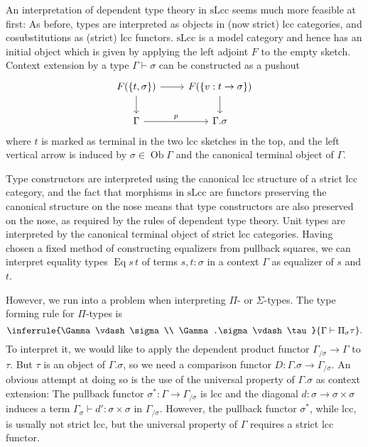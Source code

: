 \documentclass{article}
\begin{document}
An interpretation of dependent type theory in $\mathrm{sLcc}$ seems much more feasible at first:
As before, types are interpreted as objects in (now strict) lcc categories, and cosubstitutions as (strict) lcc functors.
$\mathrm{sLcc}$ is a model category and hence has an initial object which is given by applying the left adjoint $F$ to the empty sketch.
Context extension by a type $\Gamma \vdash \sigma$ can be constructed as a pushout
\begin{equation}
  \label{eq:slcc-context-extension}
  \begin{tikzcd}
    F(\{t, \sigma\}) \arrow[r] \arrow[d] & F(\{v : t \rightarrow \sigma \}) \arrow[d] \\
    \Gamma \arrow[r, "p"] & \Gamma.\sigma
  \end{tikzcd}
\end{equation}
where $t$ is marked as terminal in the two lcc sketches in the top, and the left vertical arrow is induced by $\sigma \in \operatorname{Ob} \Gamma$ and the canonical terminal object of $\Gamma$.

Type constructors are interpreted using the canonical lcc structure of a strict lcc category, and the fact that morphisms in $\mathrm{sLcc}$ are functors preserving the canonical structure on the nose means that type constructors are also preserved on the nose, as required by the rules of dependent type theory.
Unit types are interpreted by the canonical terminal object of strict lcc categories.
Having chosen a fixed method of constructing equalizers from pullback squares, we can interpret equality types $\operatorname{Eq} s \, t$ of terms $s, t : \sigma$ in a context $\Gamma$ as equalizer of $s$ and $t$.

However, we run into a problem when interpreting $\Pi$- or $\Sigma$-types.
The type forming rule for $\Pi$-types is
\begin{equation}
  \inferrule
  {\Gamma \vdash \sigma \\ \Gamma.\sigma \vdash \tau}
  {\Gamma \vdash \Pi_\sigma \tau}.
\end{equation}
To interpret it, we would like to apply the dependent product functor $\Gamma_{/ \sigma} \rightarrow \Gamma$ to $\tau$.
But $\tau$ is an object of $\Gamma.\sigma$, so we need a comparison functor $D : \Gamma.\sigma \rightarrow \Gamma_{/ \sigma}$.
An obvious attempt at doing so is the use of the universal property of $\Gamma.\sigma$ as context extension:
The pullback functor $\sigma^* : \Gamma \rightarrow \Gamma_{/ \sigma}$ is lcc and the diagonal $d : \sigma \rightarrow \sigma \times \sigma$ induces a term $\Gamma_{\sigma} \vdash d' : \sigma \times \sigma$ in $\Gamma_{/ \sigma}$.
However, the pullback functor $\sigma^*$, while lcc, is usually not strict lcc, but the universal property of $\Gamma$ requires a strict lcc functor.
\end{document}
